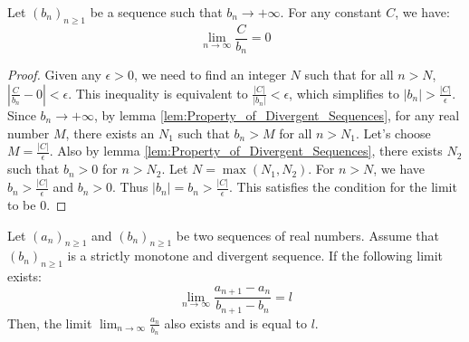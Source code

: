 \begin{lemma}
    \label{lem:Vanishing_of_the_residual_term}
    Let $(b_n)_{n\geq 1}$ be a sequence such that $b_n \to +\infty$. For any constant $C$, we have:
    $$\lim_{n\to\infty} \frac{C}{b_n} = 0$$
\end{lemma}
\begin{proof}
    Given any $\epsilon > 0$, we need to find an integer $N$ such that for all $n > N$, $\left|\frac{C}{b_n} - 0\right| < \epsilon$.
    This inequality is equivalent to $\frac{|C|}{|b_n|} < \epsilon$, which simplifies to $|b_n| > \frac{|C|}{\epsilon}$.
    Since $b_n \to +\infty$, by lemma \ref{lem:Property_of_Divergent_Sequences}, for any real number $M$, there exists an $N_1$ such that $b_n > M$ for all $n > N_1$. Let's choose $M = \frac{|C|}{\epsilon}$.
    Also by lemma \ref{lem:Property_of_Divergent_Sequences}, there exists $N_2$ such that $b_n > 0$ for $n > N_2$.
    Let $N = \max(N_1, N_2)$. For $n > N$, we have $b_n > \frac{|C|}{\epsilon}$ and $b_n>0$. Thus $|b_n| = b_n > \frac{|C|}{\epsilon}$.
    This satisfies the condition for the limit to be 0.
\end{proof}

\begin{theorem}
    \label{thm:Stolz-Cesaro_Theorem_for_the_infinity_case}
    Let $(a_n)_{n\geq 1}$ and $(b_n)_{n\geq 1}$ be two sequences of real numbers. Assume that $(b_n)_{n\geq 1}$ is a strictly monotone and divergent sequence. If the following limit exists:
    $$\lim_{n\to\infty} \frac{a_{n+1}-a_n}{b_{n+1}-b_n} = l$$
    Then, the limit $\lim_{n\to\infty} \frac{a_n}{b_n}$ also exists and is equal to $l$.
\end{theorem}

